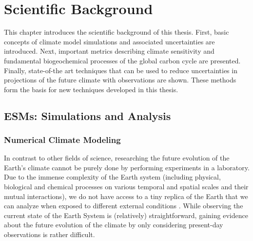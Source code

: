 


\chapter{Scientific Background}
\label{ch:02:scientific_background}

This chapter introduces the scientific background of this thesis. First, basic
concepts of climate model simulations and associated uncertainties are
introduced. Next, important metrics describing climate sensitivity and
fundamental biogeochemical processes of the global carbon cycle are presented.
Finally, state-of-the art techniques that can be used to reduce uncertainties
in projections of the future climate with observations are shown. These methods
form the basis for new techniques developed in this thesis.


\section{\aclp{ESM}: Simulations and Analysis}
\label{sec:02:esms}


\subsection{Numerical Climate Modeling}
\label{subsec:02:numerical_climate_modeling}

In contrast to other fields of science, researching the future evolution of the
Earth's climate cannot be purely done by performing experiments in a
laboratory. Due to the immense complexity of the Earth system (including
physical, biological and chemical processes on various temporal and spatial
scales and their mutual interactions), we do not have access to a tiny replica
of the Earth that we can analyze when exposed to different external conditions
\autocite{Flato2011}. While observing the current state of the Earth System is
(relatively) straightforward, gaining evidence about the future evolution of
the climate by only considering present-day observations is rather difficult.

